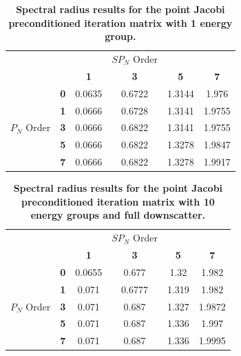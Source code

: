 \begin{table}[h!]
  \begin{center}
    \begin{tabular}{cccccc}\hline\hline
      \multicolumn{1}{c}{}& 
      \multicolumn{1}{c}{}& 
      \multicolumn{1}{c}{}& 
      \multicolumn{1}{c}{$SP_N$ Order}& 
      \multicolumn{1}{c}{}& 
      \multicolumn{1}{c}{} \\
       &   & \textbf{1} & \textbf{3} & \textbf{5} & \textbf{7}  \\
       & \textbf{0} & 0.0635 & 0.6722 & 1.3144 & 1.976 \\
       & \textbf{1} & 0.0666 & 0.6728 & 1.3141 & 1.9755 \\
      $P_N$ Order & \textbf{3} & 0.0666 & 0.6822 & 1.3141 & 1.9755 \\
       & \textbf{5} & 0.0666 & 0.6822 & 1.3278 & 1.9847 \\
       & \textbf{7} & 0.0666 & 0.6822 & 1.3278 & 1.9917 \\
      \hline\hline
    \end{tabular}
  \end{center}
  \caption{\textbf{Spectral radius results for the point Jacobi
      preconditioned iteration matrix with 1 energy group.}}
  \label{tab:group1pj}
\end{table}
\begin{table}[h!]
  \begin{center}
    \begin{tabular}{cccccc}\hline\hline
      \multicolumn{1}{c}{}& 
      \multicolumn{1}{c}{}& 
      \multicolumn{1}{c}{}& 
      \multicolumn{1}{c}{$SP_N$ Order}& 
      \multicolumn{1}{c}{}& 
      \multicolumn{1}{c}{} \\
       &   & \textbf{1} & \textbf{3} & \textbf{5} & \textbf{7}  \\
       & \textbf{0} & 0.0655 & 0.677 & 1.32 & 1.982 \\
       & \textbf{1} & 0.071 & 0.6777 & 1.319 & 1.982 \\
      $P_N$ Order & \textbf{3} & 0.071 & 0.687 & 1.327 & 1.9872 \\
       & \textbf{5} & 0.071 & 0.687 & 1.336 & 1.997 \\
       & \textbf{7} & 0.071 & 0.687 & 1.336 & 1.9995 \\
      \hline\hline
    \end{tabular}
  \end{center}
  \caption{\textbf{Spectral radius results for the point Jacobi
      preconditioned iteration matrix with 10 energy groups and full
      downscatter.}}
  \label{tab:group10dspj}
\end{table}
